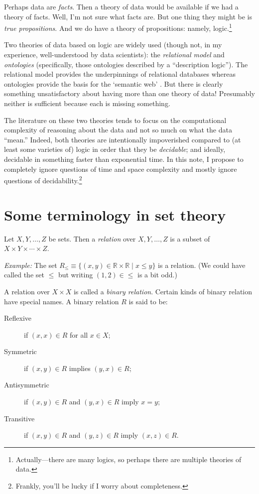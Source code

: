 \documentclass[10pt, a4paper, twocolumn]{article}
\begin{document}
Perhaps data are \emph{facts}. Then a theory of data would be available if we
had a theory of facts. Well, I'm not sure what facts are. But one thing they
might be is \emph{true propositions}. And we do have a theory of propositions:
namely, logic.\footnote{Actually---there are many logics, so perhaps there are
multiple theories of data.}

Two theories of data based on logic are widely used (though not, in my
experience, well-understood by data scientists): the \emph{relational model} and
\emph{ontologies} (specifically, those ontologies described by a ``description
logic''). The relational model provides the underpinnings of relational
databases \parencite{codd1970relational} whereas ontologies provide the basis
for the `semantic web' \parencite{DBLP:journals/corr/abs-1201-4089}. But there
is clearly something unsatisfactory about having more than one theory of data!
Presumably neither is sufficient because each is missing something.

The literature on these two theories tends to focus on the computational
complexity of reasoning about the data and not so much on what the data
``mean.''  Indeed, both theories are intentionally impoverished compared to (at
least some varieties of) logic in order that they be \emph{decidable}; and
ideally, decidable in something faster than exponential time. In this note, I
propose to completely ignore questions of time and space complexity and mostly
ignore questions of decidability.\footnote{Frankly, you'll be lucky if I worry
about completeness.}

\section{Some terminology in set theory}

Let $X, Y, \dots, Z$ be sets. Then a \emph{relation} over $X, Y, \dots, Z$ is a
subset of $X\times Y\times\dotsm\times Z$.

\emph{Example:} The set $R_\leq \equiv \{(x, y)\in\mathbb{R}\times\mathbb{R} \mid x\leq y\}$ is a
relation. (We could have called the set $\leq$ but writing $(1, 2)\in\leq$ is a bit odd.)

A relation over $X\times X$ is called a \emph{binary relation}. Certain
kinds of binary relation have special names. A binary relation $R$ is said to
be:
\begin{description}
\item[Reflexive] if $(x, x)\in R$ for all $x\in X$;
\item[Symmetric] if $(x, y)\in R$ implies $(y,x)\in R$;
\item[Antisymmetric] if $(x, y)\in R$ and $(y, x)\in R$ imply $x = y$;
\item[Transitive] if $(x, y)\in R$ and $(y, z)\in R$ imply $(x, z) \in R$.
\end{description}
\end{document}
